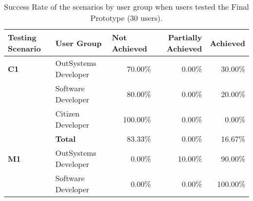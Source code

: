 \begin{table}[tb]
    \caption{Success Rate of the scenarios by user group when users tested the Final Prototype (30 users).}
      \label{tab:effectiveness_final_prototype}
    \begin{tabular}{llrrr}
    \hline
    \rowcolor[HTML]{EFEFEF} 
    \textbf{Testing Scenario} & \textbf{User Group}  & \multicolumn{1}{l}{\cellcolor[HTML]{EFEFEF}\textbf{Not Achieved}} & \multicolumn{1}{C{2cm}}{\cellcolor[HTML]{EFEFEF}\textbf{Partially Achieved}} & \multicolumn{1}{l}{\cellcolor[HTML]{EFEFEF}\textbf{Achieved}} \\ \hline
    \textbf{C1}               & OutSystems Developer & 70.00\%                                                           & 0.00\%                                                                  & 30.00\%                                                       \\
                              & Software Developer   & 80.00\%                                                           & 0.00\%                                                                  & 20.00\%                                                       \\
                              & Citizen Developer    & 100.00\%                                                          & 0.00\%                                                                  & 0.00\%                                                        \\
                              & \textbf{Total}       & 83.33\%                                                           & 0.00\%                                                                  & 16.67\%                                                       \\ \hline
    \textbf{M1}               & OutSystems Developer & 0.00\%                                                            & 10.00\%                                                                 & 90.00\%                                                       \\
                              & Software Developer   & 0.00\%                                                            & 0.00\%                                                                  & 100.00\%                                                      \\

\end{tabular}
\end{table}
